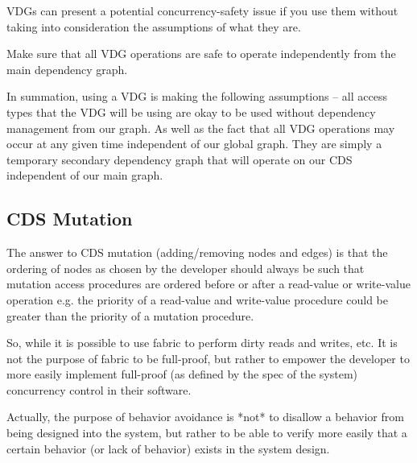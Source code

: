 VDGs can present a potential concurrency-safety issue if you use them without taking into consideration the assumptions of what they are.

Make sure that all VDG operations are safe to operate independently from the main dependency graph.

In summation, using a VDG is making the following assumptions -- all access types that the VDG will be using are okay to be used without dependency management from our graph. As well as the fact that all VDG operations may occur at any given time independent of our global graph. They are simply a temporary secondary dependency graph that will operate on our CDS independent of our main graph.

\subsection{CDS Mutation}

The answer to CDS mutation (adding/removing nodes and edges) is that the ordering of nodes as chosen by the developer should always be such that mutation access procedures are ordered before or after a read-value or write-value operation e.g. the priority of a read-value and write-value procedure could be greater than the priority of a mutation procedure.

So, while it is possible to use fabric to perform dirty reads and writes, etc. It is not the purpose of fabric to be full-proof, but rather to empower the developer to more easily implement full-proof (as defined by the spec of the system) concurrency control in their software.

Actually, the purpose of behavior avoidance is *not* to disallow a behavior from being designed into the system, but rather to be able to verify more easily that a certain behavior (or lack of behavior) exists in the system design.
